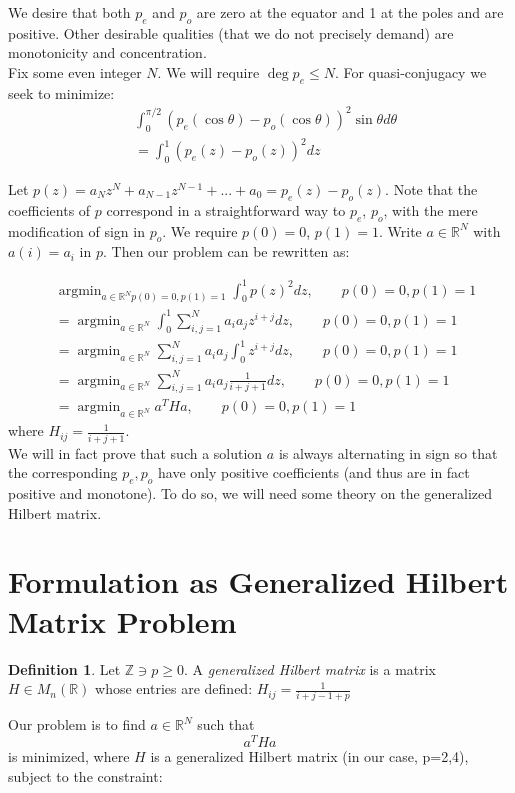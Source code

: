 \documentclass[11pt]{article}
\theoremstyle{definition}
\newtheorem{defn}[thm]{Definition}
\theoremstyle{remark}
\numberwithin{equation}{section}
\DeclareMathOperator{\argmin}{argmin}
\begin{document}
We desire that both $p_e$ and $p_o$ are zero at the equator and 1 at the poles and are positive. Other desirable qualities (that we do not precisely demand) are monotonicity and concentration.\\

Fix some even integer $N$. We will require $\deg p_e \le N$. For quasi-conjugacy we seek to minimize: 
\begin{align*}
&\int_0^{\pi/2} (p_e(\cos\theta) - p_o(\cos\theta))^2 \sin\theta d\theta\\
&= \int_0^1 (p_e(z) - p_o(z))^2 dz
\end{align*}

Let $p(z) = a_Nz^N + a_{N-1}z^{N-1} + ... + a_0 = p_e(z) - p_o(z)$. Note that the coefficients of $p$ correspond in a straightforward way to $p_e$, $p_o$, with the mere modification of sign in $p_o$. We require $p(0) = 0$, $p(1) = 1$. Write $a\in \mathbb{R}^N$ with $a(i) = a_i$ in $p$. Then our problem can be rewritten as: 

\begin{align*}
& \argmin_{a\in\mathbb{R}^N p(0)=0,p(1)=1} \int_0^1 p(z)^2 dz, \qquad p(0)=0, p(1)=1 \\
&=\argmin_{a\in\mathbb{R}^N} \int_0^1 \sum_{i,j=1}^N a_ia_j z^{i+j} dz, \qquad p(0)=0, p(1)=1\\
&= \argmin_{a\in\mathbb{R}^N} \sum_{i,j=1}^N a_ia_j \int_0^1 z^{i+j} dz, \qquad p(0)=0, p(1)=1\\
&= \argmin_{a\in\mathbb{R}^N} \sum_{i,j=1}^N a_ia_j \frac{1}{i+j+1} dz, \qquad p(0)=0, p(1)=1\\
&= \argmin_{a\in\mathbb{R}^N} a^T H a, \qquad p(0)=0, p(1)=1
\end{align*} where $H_{ij} = \frac{1}{i+j+1}$. \\

We will in fact prove that such a solution $a$ is always alternating in sign so that the corresponding $p_e, p_o$ have only positive coefficients (and thus are in fact positive and monotone). To do so, we will need some theory on the generalized Hilbert matrix. 

\section{Formulation as Generalized Hilbert Matrix Problem}\label{formulationa-hilbert}
\begin{defn} 
Let $\mathbb{Z} \ni p \ge 0$. A \emph{generalized Hilbert matrix} is a matrix $H\in M_n(\mathbb{R})$ whose entries are defined: 
$H_{ij} = \frac{1}{i+j-1+p}$
\end{defn}
Our problem is to find $a\in\mathbb{R}^N$ such that 
\begin{equation}
a^T H a\end{equation}
is minimized, where $H$ is a generalized Hilbert matrix (in our case, p=2,4), subject to the constraint: 
\end{document}

